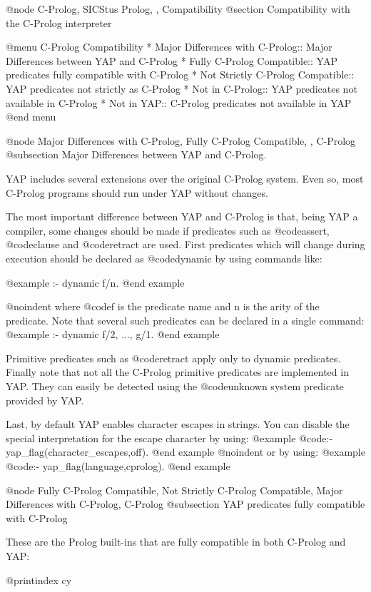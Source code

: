 {{{{{{{{@node C-Prolog, SICStus Prolog, , Compatibility
@section Compatibility with the C-Prolog interpreter

@menu
C-Prolog Compatibility
* Major Differences with C-Prolog:: Major Differences between YAP and C-Prolog
* Fully C-Prolog Compatible:: YAP predicates fully compatible with
C-Prolog
* Not Strictly C-Prolog Compatible:: YAP predicates not strictly as C-Prolog
* Not in C-Prolog:: YAP predicates not available in C-Prolog
* Not in YAP:: C-Prolog predicates not available in YAP
@end menu

@node Major Differences with C-Prolog, Fully C-Prolog Compatible, , C-Prolog
@subsection Major Differences between YAP and C-Prolog.

YAP includes several extensions over the original C-Prolog system. Even
so, most C-Prolog programs should run under YAP without changes.

The most important difference between YAP and C-Prolog is that, being
YAP a compiler, some changes should be made if predicates such as
@code{assert}, @code{clause} and @code{retract} are used. First
predicates which will change during execution should be declared as
@code{dynamic} by using commands like:

@example
:- dynamic f/n.
@end example

@noindent where @code{f} is the predicate name and n is the arity of the
predicate. Note that  several such predicates can be declared in a
single command:
@example
 :- dynamic f/2, ..., g/1.
@end example

Primitive predicates such as @code{retract} apply only to dynamic
predicates.  Finally note that not all the C-Prolog primitive predicates
are implemented in YAP. They can easily be detected using the
@code{unknown} system predicate provided by YAP.

Last, by default YAP enables character escapes in strings. You can
disable the special interpretation for the escape character by using:
@example
@code{:- yap_flag(character_escapes,off).}
@end example
@noindent
or by using:
@example
@code{:- yap_flag(language,cprolog).}
@end example

@node Fully C-Prolog Compatible, Not Strictly C-Prolog Compatible, Major Differences with C-Prolog, C-Prolog
@subsection YAP predicates fully compatible with C-Prolog

These are the Prolog built-ins that are fully compatible in both
C-Prolog and YAP:

@printindex cy

}}}}}}}}
